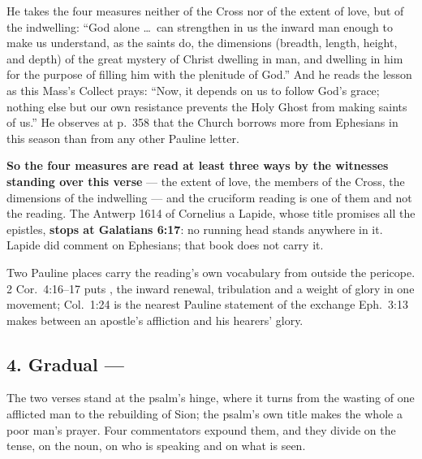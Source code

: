 \begin{witnessnote}
He takes the four measures neither of the Cross nor of the extent of love, but of
the indwelling: ``God alone \dots\ can strengthen in us the inward man enough to
make us understand, as the saints do, the dimensions (breadth, length, height,
and depth) of the great mystery of Christ dwelling in man, and dwelling in him
for the purpose of filling him with the plenitude of God.'' And he reads the
lesson as this Mass's Collect prays: ``Now, it depends on us to follow God's
grace; nothing else but our own resistance prevents the Holy Ghost from making
saints of us.'' He observes at p.~358 that the Church borrows more from Ephesians
in this season than from any other Pauline letter.
\end{witnessnote}

\textbf{So the four measures are read at least three ways by the witnesses
standing over this verse} --- the extent of love, the members of the Cross, the
dimensions of the indwelling --- and the cruciform reading is one of them and not
the reading. The Antwerp 1614
 of Cornelius a Lapide, whose title
promises all the epistles, \textbf{stops at Galatians 6:17}: no  running head stands anywhere in it. Lapide did comment on Ephesians;
that book does not carry it.

Two Pauline places carry the reading's own vocabulary from outside the pericope.
2 Cor.~4:16--17 puts , the inward renewal, tribulation and
a weight of glory in one movement; Col.~1:24 is the nearest Pauline statement of
the exchange Eph.~3:13 makes between an apostle's affliction and his hearers'
glory.

\subsection*{4. Gradual  --- }

The two verses stand at the psalm's hinge, where it turns from the wasting of
one afflicted man to the rebuilding of Sion; the psalm's own title makes the
whole a poor man's prayer. Four commentators expound them, and they divide on
the tense, on the noun, on who is speaking and on what is seen.

